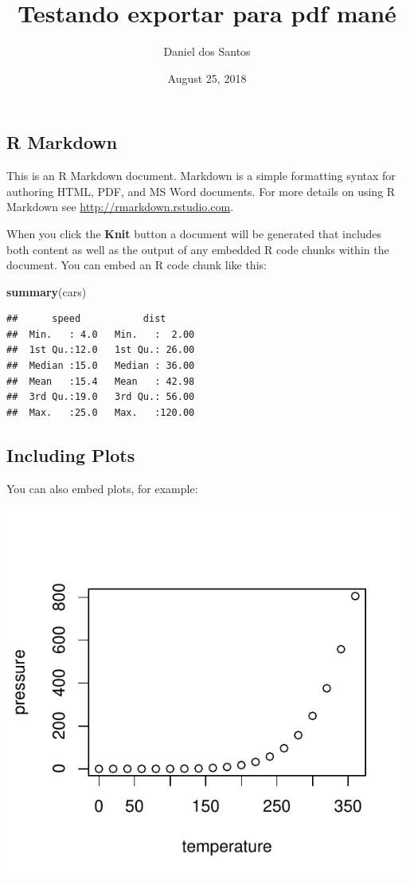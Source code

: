 \documentclass[]{article}
\title{Testando exportar para pdf mané}
\author{Daniel dos Santos}
\date{August 25, 2018}
\newenvironment{Shaded}{\begin{snugshade}}{\end{snugshade}}
\newcommand{\KeywordTok}[1]{\textcolor[rgb]{0.13,0.29,0.53}{\textbf{#1}}}
\newcommand{\NormalTok}[1]{#1}
\begin{document}
\maketitle

{
\setcounter{tocdepth}{1}
\tableofcontents
}
\subsection{R Markdown}\label{r-markdown}

This is an R Markdown document. Markdown is a simple formatting syntax
for authoring HTML, PDF, and MS Word documents. For more details on
using R Markdown see \url{http://rmarkdown.rstudio.com}.

When you click the \textbf{Knit} button a document will be generated
that includes both content as well as the output of any embedded R code
chunks within the document. You can embed an R code chunk like this:

\begin{Shaded}
\begin{Highlighting}[]
\KeywordTok{summary}\NormalTok{(cars)}
\end{Highlighting}
\end{Shaded}

\begin{verbatim}
##      speed           dist       
##  Min.   : 4.0   Min.   :  2.00  
##  1st Qu.:12.0   1st Qu.: 26.00  
##  Median :15.0   Median : 36.00  
##  Mean   :15.4   Mean   : 42.98  
##  3rd Qu.:19.0   3rd Qu.: 56.00  
##  Max.   :25.0   Max.   :120.00
\end{verbatim}

\subsection{Including Plots}\label{including-plots}

You can also embed plots, for example:

\begin{center}\includegraphics{relatorio_test_files/figure-latex/pressure-1} \end{center}
\end{document}
